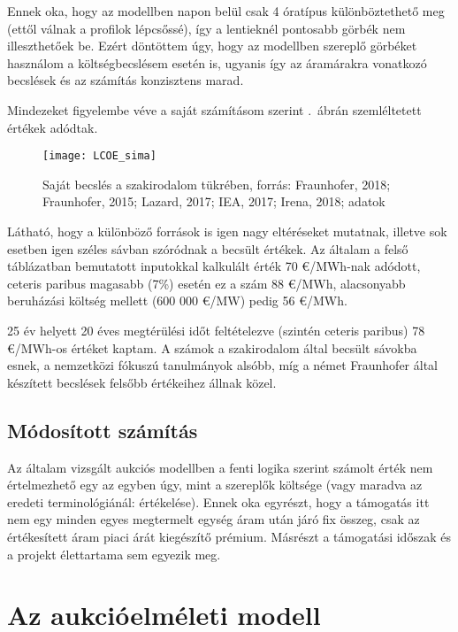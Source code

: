 \documentclass[twoside, magyar, showtrims]{corvinusphd}
\begin{document}
Ennek oka, hogy az  modellben napon belül csak 4 óratípus
különböztethető meg (ettől válnak a profilok lépcsőssé),
így a lentieknél pontosabb görbék nem illeszthetőek be.
Ezért döntöttem úgy, hogy az  modellben szereplő görbéket
használom a költségbecslésem esetén is,
ugyanis így az áramárakra vonatkozó becslések és
az  számítás konzisztens marad. 
\label{konz}

Mindezeket figyelembe véve a saját számításom szerint 
.~ábrán szemléltetett értékek adódtak.

\begin{figure}
    \centering
    \texttt{[image: LCOE\_sima]}
    \caption{Saját  becslés a szakirodalom tükrében, forrás: Fraunhofer, 2018; Fraunhofer, 2015; Lazard, 2017; IEA, 2017; Irena, 2018;  adatok}
    \label{fig:sajat}
\end{figure}

Látható, hogy a különböző források is igen nagy eltéréseket mutatnak,
illetve sok esetben igen széles sávban szóródnak a becsült értékek.
Az általam a felső táblázatban bemutatott inputokkal kalkulált érték
70 €/MWh-nak adódott, ceteris paribus magasabb
 (7\%) esetén ez a szám 88 €/MWh,
alacsonyabb beruházási költség mellett (600 000 €/MW) pedig 56 €/MWh. 

25 év helyett 20 éves megtérülési időt feltételezve (szintén ceteris paribus)
78 €/MWh-os  értéket kaptam.
A számok a szakirodalom által becsült sávokba esnek,
a nemzetközi fókuszú tanulmányok alsóbb, míg a német Fraunhofer által
készített becslések felsőbb értékeihez állnak közel.


\section{Módosított  számítás}

Az általam vizsgált aukciós modellben a fenti logika szerint számolt
 érték nem értelmezhető egy az egyben úgy,
mint a szereplők költsége (vagy maradva az eredeti terminológiánál: értékelése).
Ennek oka egyrészt, hogy a támogatás itt nem egy minden egyes
megtermelt egység áram után járó fix összeg,
csak az értékesített áram piaci árát kiegészítő prémium.
Másrészt a támogatási időszak és a projekt élettartama sem egyezik meg. 

\chapter{Az aukcióelméleti modell}
\end{document}
